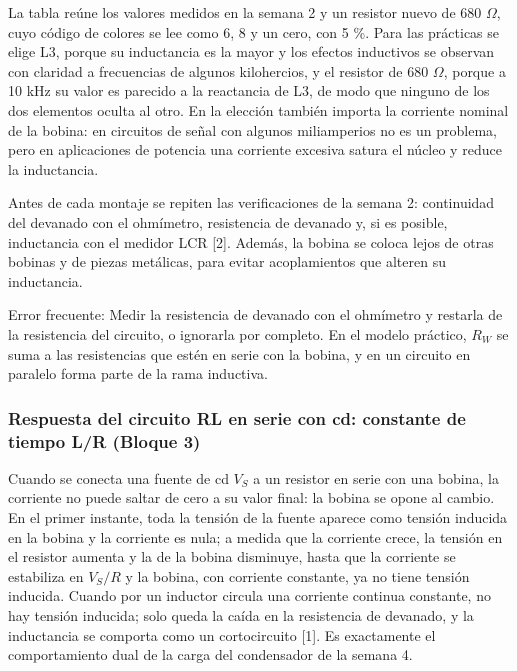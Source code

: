 \documentclass[11pt,letterpaper]{article}
\begin{document}
La tabla reúne los valores medidos en la semana 2 y un resistor nuevo de 680 \ensuremath{\Omega}, cuyo código de colores se lee como 6, 8 y un cero, con \textpm{}5 \%. Para las prácticas se elige L3, porque su inductancia es la mayor y los efectos inductivos se observan con claridad a frecuencias de algunos kilohercios, y el resistor de 680 \ensuremath{\Omega}, porque a 10 kHz su valor es parecido a la reactancia de L3, de modo que ninguno de los dos elementos oculta al otro. En la elección también importa la corriente nominal de la bobina: en circuitos de señal con algunos miliamperios no es un problema, pero en aplicaciones de potencia una corriente excesiva satura el núcleo y reduce la inductancia.

Antes de cada montaje se repiten las verificaciones de la semana 2: continuidad del devanado con el ohmímetro, resistencia de devanado y, si es posible, inductancia con el medidor LCR [2]. Además, la bobina se coloca lejos de otras bobinas y de piezas metálicas, para evitar acoplamientos que alteren su inductancia.

\begin{nota}{Error frecuente:}
Medir la resistencia de devanado con el ohmímetro y restarla de la resistencia del circuito, o ignorarla por completo. En el modelo práctico, $R_W$ se suma a las resistencias que estén en serie con la bobina, y en un circuito en paralelo forma parte de la rama inductiva.
\end{nota}

\subsubsection{Respuesta del circuito RL en serie con cd: constante de tiempo L/R (Bloque 3)}

Cuando se conecta una fuente de cd $V_S$ a un resistor en serie con una bobina, la corriente no puede saltar de cero a su valor final: la bobina se opone al cambio. En el primer instante, toda la tensión de la fuente aparece como tensión inducida en la bobina y la corriente es nula; a medida que la corriente crece, la tensión en el resistor aumenta y la de la bobina disminuye, hasta que la corriente se estabiliza en $V_S/R$ y la bobina, con corriente constante, ya no tiene tensión inducida. Cuando por un inductor circula una corriente continua constante, no hay tensión inducida; solo queda la caída en la resistencia de devanado, y la inductancia se comporta como un cortocircuito [1]. Es exactamente el comportamiento dual de la carga del condensador de la semana 4.
\end{document}
